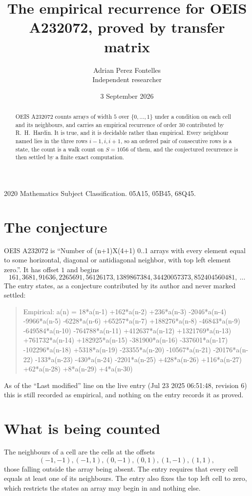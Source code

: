 \documentclass[11pt,a4paper]{article}
\title{The empirical recurrence for OEIS A232072, proved by transfer matrix}
\author{Adrian Perez Fontelles\\ \small Independent researcher}
\date{3 September 2026}
\theoremstyle{plain}
\theoremstyle{definition}
\begin{document}
\maketitle

\begin{abstract}
OEIS A232072 counts arrays of width $5$ over $\{0,\dots,1\}$ under a condition on each cell
and its neighbours, and carries an empirical recurrence of order $30$ contributed by
R.~H.~Hardin. It is true, and it is decidable rather than empirical. Every neighbour named lies
in the three rows $i-1,i,i+1$, so an ordered pair of consecutive rows is a state, the count is
a walk count on $S=1056$ of them, and the conjectured recurrence is then settled by a finite
exact computation.
\end{abstract}

\noindent\small 2020 Mathematics Subject Classification. 05A15, 05B45, 68Q45.\normalsize

\section{The conjecture}

OEIS A232072 is ``Number of (n+1)X(4+1) 0..1 arrays with every element equal to some horizontal, diagonal or antidiagonal neighbor, with top left element zero.''. It has offset $1$ and begins
\[
161, 3681, 91636, 2265691, 56126173, 1389867384, 34420057373, 852404560481,\ \dots
\]
The entry states, as a conjecture contributed by its author and never marked settled:
\begin{quote}
Empirical: a(n) = 18*a(n-1) +162*a(n-2) +236*a(n-3) -2046*a(n-4) -9966*a(n-5) -6228*a(n-6) +65257*a(n-7) +188276*a(n-8) -46843*a(n-9) -649584*a(n-10) -764788*a(n-11) +412637*a(n-12) +1321769*a(n-13) +761732*a(n-14) +182925*a(n-15) -381900*a(n-16) -337601*a(n-17) -102296*a(n-18) +5318*a(n-19) -23355*a(n-20) -10567*a(n-21) -20176*a(n-22) -133*a(n-23) -430*a(n-24) -2201*a(n-25) +428*a(n-26) +116*a(n-27) +62*a(n-28) +8*a(n-29) +4*a(n-30)
\end{quote}
As of the ``Last modified'' line on the live entry (Jul 23 2025 06:51:48, revision 6) this is still
recorded as empirical, and nothing on the entry records it as proved.

\section{What is being counted}

The neighbours of a cell are the cells at the offsets
\[
(-1,-1), (-1,1), (0,-1), (0,1), (1,-1), (1,1),
\]
those falling outside the array being absent. The entry requires that every cell equals at least one of its neighbours. The entry also fixes the top left cell to zero, which restricts the states an array may begin in and nothing else.
\end{document}
